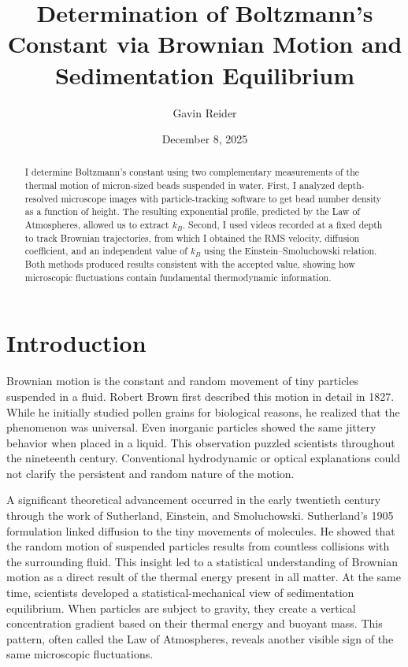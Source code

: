 \documentclass[%
 reprint,
 amsmath,amssymb,
 aps,
]{revtex4-2}
\begin{document}
\title{Determination of Boltzmann's Constant via Brownian Motion and Sedimentation Equilibrium}

\author{Gavin Reider}

\date{December 8, 2025}

\begin{abstract}  
I determine Boltzmann’s constant using two complementary measurements of the thermal motion of micron-sized beads suspended in water. First, I analyzed depth-resolved microscope images with particle-tracking software to get bead number density as a function of height. The resulting exponential profile, predicted by the Law of Atmospheres, allowed us to extract $k_B$. Second, I used videos recorded at a fixed depth to track Brownian trajectories, from which I obtained the RMS velocity, diffusion coefficient, and an independent value of $k_B$ using the Einstein–Smoluchowski relation. Both methods produced results consistent with the accepted value, showing how microscopic fluctuations contain fundamental thermodynamic information.  
\end{abstract}  

\maketitle

\section*{Introduction}

Brownian motion is the constant and random movement of tiny particles suspended in a fluid. Robert Brown first described this motion in detail in 1827. While he initially studied pollen grains for biological reasons, he realized that the phenomenon was universal. Even inorganic particles showed the same jittery behavior when placed in a liquid. This observation puzzled scientists throughout the nineteenth century. Conventional hydrodynamic or optical explanations could not clarify the persistent and random nature of the motion. \cite{Brown1866}

A significant theoretical advancement occurred in the early twentieth century through the work of Sutherland, Einstein, and Smoluchowski. Sutherland’s 1905 formulation linked diffusion to the tiny movements of molecules. He showed that the random motion of suspended particles results from countless collisions with the surrounding fluid. This insight led to a statistical understanding of Brownian motion as a direct result of the thermal energy present in all matter. At the same time, scientists developed a statistical-mechanical view of sedimentation equilibrium. When particles are subject to gravity, they create a vertical concentration gradient based on their thermal energy and buoyant mass. This pattern, often called the Law of Atmospheres, reveals another visible sign of the same microscopic fluctuations. \cite{Sutherland1905}
\end{document}
